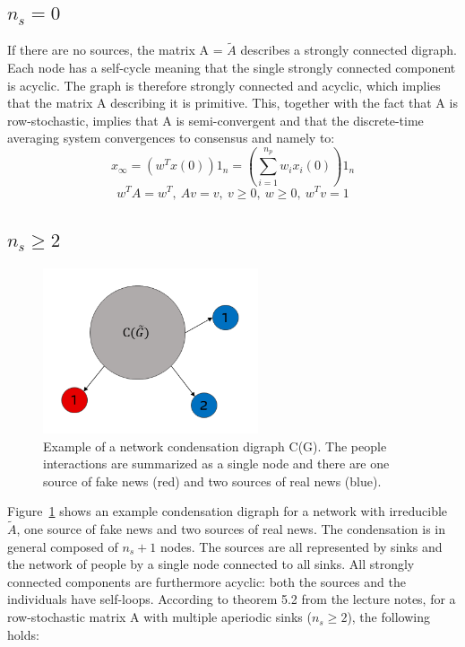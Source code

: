 \subsection{$n_s = 0$}
If there are no sources, the matrix A = $\tilde{A}$ describes a strongly connected digraph. Each node has a self-cycle meaning that the single strongly connected component is acyclic. The graph is therefore strongly connected and acyclic, which implies that the matrix A describing it is primitive. This, together with the fact that A is row-stochastic, implies that A is semi-convergent and that the discrete-time averaging system convergences to consensus and namely to:
$$
x_{\infty} = (w^Tx(0))1_n = \left(\sum_{i=1}^{n_p}w_ix_i(0)\right)1_n
$$
$$
w^TA = w^T,\ 
Av = v,\ 
v \geq 0,\ w \geq 0,\ w^Tv = 1
$$
\subsection{$n_s \geq 2$}
\begin{figure}[!t]
	\centering
	\includegraphics[width=2.5in]{Figures/condensation_digraph.png}
	\caption{Example of a network condensation digraph C(G). The people interactions are summarized as a single node and there are one source of fake news (red) and two sources of real news (blue).}
	\label{pics:condensation_digraph_example}
\end{figure}
Figure~\ref{pics:condensation_digraph_example} shows an example condensation digraph for a network with irreducible $\tilde{A}$, one source of fake news and two sources of real news. The condensation is in general composed of $n_s+1$ nodes. The sources are all represented by sinks and the network of people by a single node connected to all sinks. \newline
All strongly connected components are furthermore acyclic: both the sources and the individuals have self-loops.
According to theorem 5.2 from the lecture notes, for a row-stochastic matrix A with multiple aperiodic sinks ($n_s \geq 2$), the following holds:
